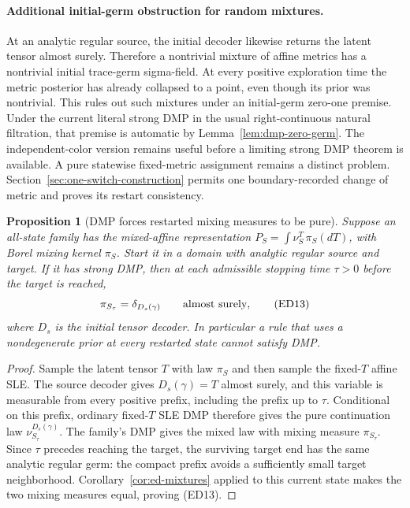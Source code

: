 \documentclass[11pt]{article}
\newtheorem{proposition}[theorem]{Proposition}
\theoremstyle{definition}\newtheorem{definition}[theorem]{Definition}
\theoremstyle{remark}\newtheorem{remark}[theorem]{Remark}
\begin{document}
\paragraph{Additional initial-germ obstruction for random mixtures.}
At an analytic regular source, the initial decoder likewise returns the
latent tensor almost surely. Therefore a nontrivial mixture of affine
metrics has a nontrivial initial trace-germ sigma-field. At every
positive exploration time the metric posterior has already collapsed to
a point, even though its prior was nontrivial. This rules out such mixtures under an initial-germ zero-one premise.
Under the current literal strong DMP in the usual right-continuous
natural filtration, that premise is automatic by
Lemma~\ref{lem:dmp-zero-germ}. The independent-color version remains
useful before a limiting strong DMP theorem is available. A pure statewise fixed-metric assignment remains a distinct problem.
Section~\ref{sec:one-switch-construction} permits one boundary-recorded
change of metric and proves its restart consistency.

\begin{proposition}[DMP forces restarted mixing measures to be pure]
\label{prop:ed-posterior}
Suppose an all-state family has the mixed-affine representation
$P_S=\int\nu^T_S\,\pi_S(dT)$, with Borel mixing kernel $\pi_S$.
Start it in a domain with analytic regular source and target. If it has
strong DMP, then at each admissible stopping time $\tau>0$ before the
target is reached,
\[
 \pi_{S_\tau}=\delta_{D_s(\gamma)}\qquad\hbox{almost surely},
 \tag{ED13}
\]
where $D_s$ is the initial tensor decoder. In particular a rule that
uses a nondegenerate prior at every restarted state cannot satisfy DMP.
\end{proposition}
\begin{proof}
Sample the latent tensor $T$ with law $\pi_S$ and then sample the
fixed-$T$ affine SLE. The source decoder gives $D_s(\gamma)=T$ almost
surely, and this variable is measurable from every positive prefix,
including the prefix up to $\tau$. Conditional on this prefix,
ordinary fixed-$T$ SLE DMP therefore gives the pure continuation law
$\nu^{D_s(\gamma)}_{S_\tau}$. The family's DMP gives the mixed law with
mixing measure $\pi_{S_\tau}$. Since $\tau$ precedes reaching the
target, the surviving target end has the same analytic regular germ:
the compact prefix avoids a sufficiently small target neighborhood.
Corollary~\ref{cor:ed-mixtures} applied to this current state makes
the two mixing measures equal, proving (ED13).
\end{proof}
\end{document}
